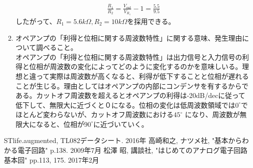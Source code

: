 \documentclass[a4j,dvipdfmx,autodetect-engine]{jsarticle}
\begin{document}
\begin{enumerate}
\begin{eqnarray}
        \frac{R_1}{R_2} = \frac{V_{out}}{V_{R_1}} - 1 = \frac{5.5}{9.5}
    \end{eqnarray}
    したがって、$R_1 = 5.6k\Omega, R_2 = 10k\Omega$を採用できる。
    \item オペアンプの「利得と位相に関する周波数特性」に関する意味、発生理由について調べること。\\
    \quad オペアンプの「利得と位相に関する周波数特性」は出力信号と入力信号の利得と位相が周波数の変化によってどのように変化するのかを意味しいる。理想と違って実際は周波数が高くなると、利得が低下することと位相が遅れることが生じる。理由としてはオペアンプの内部にコンデンサを有するからである。カットオフ周波数を超えるとオペアンプの利得は-20dB/decに従って低下して、無限大に近づくと０になる。位相の変化は低周波数領域では$0^{\circ}$でほとんど変わらないが、カットオフ周波数における$45^{\circ}$
    になり、周波数が無限大になると、位相が$90^{\circ}$に近づいていく。
\end{enumerate}


\begin{thebibliography}{3}
STlife.augmented, TL082データシート. 2016年
高崎和之,
ナツメ社,
"基本からわかる電子回路" p.138.
2009年7月
松澤 昭,
講談社,
"はじめてのアナログ電子回路 基本回" pp.113, 175.
2017年2月

\end{thebibliography}
\end{document}
